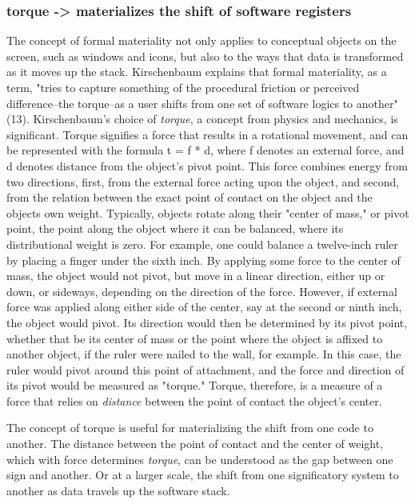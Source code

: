 \documentclass[11pt]{article}
\begin{document}
\subsubsection{torque -> materializes the shift of software registers}
\label{sec:org9f4481a}
The concept of formal materiality not only applies to conceptual
objects on the screen, such as windows and icons, but also to the ways
that data is transformed as it moves up the stack. Kirschenbaum
explains that formal materiality, as a term, "tries to capture
something of the procedural friction or perceived difference--the
torque--as a user shifts from one set of software logics to another"
(13). Kirschenbaum's choice of \emph{torque}, a concept from physics and
mechanics, is significant. Torque signifies a force that results in a
rotational movement, and can be represented with the formula t = f *
d, where f denotes an external force, and d denotes distance from the
object's pivot point. This force combines energy from two directions,
first, from the external force acting upon the object, and second,
from the relation between the exact point of contact on the object and
the objects own weight. Typically, objects rotate along their "center
of mass," or pivot point, the point along the object where it can be
balanced, where its distributional weight is zero. For example, one
could balance a twelve-inch ruler by placing a finger under the sixth
inch. By applying some force to the center of mass, the object would
not pivot, but move in a linear direction, either up or down, or
sideways, depending on the direction of the force. However, if
external force was applied along either side of the center, say at the
second or ninth inch, the object would pivot. Its direction would then
be determined by its pivot point, whether that be its center of mass
or the point where the object is affixed to another object, if the
ruler were nailed to the wall, for example. In this case, the ruler
would pivot around this point of attachment, and the force and
direction of its pivot would be measured as "torque." Torque,
therefore, is a measure of a force that relies on \emph{distance} between
the point of contact the object's center. 

The concept of torque is useful for materializing the shift from one
code to another. The distance between the point of contact and the
center of weight, which with force determines \emph{torque}, can be
understood as the gap between one sign and another. Or at a larger
scale, the shift from one significatory system to another as data
travels up the software stack. 
\end{document}
